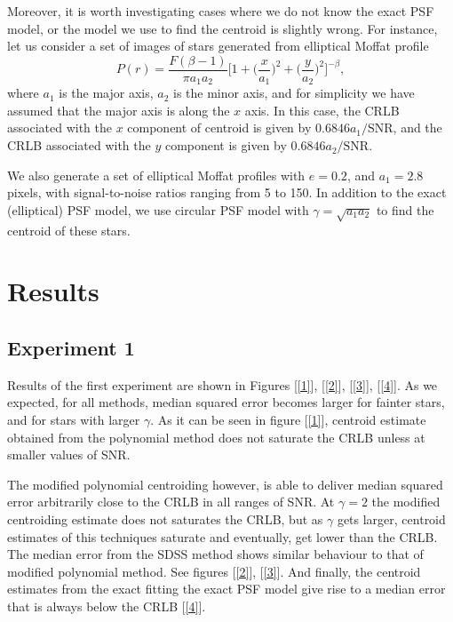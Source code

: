 \documentclass[12pt, preprint]{aastex}
\newcommand{\beq}{\begin{equation}}
\newcommand{\eeq}{\end{equation}}
\begin{document}
Moreover, it is worth investigating cases where we do not know the exact PSF model, or the model we use to find the centroid is slightly wrong. For instance, let us consider a set of images of stars generated from elliptical Moffat profile
\beq
P(r) = \frac{F(\beta - 1)}{\pi a_{1}a_{2}}\Big[1+\Big(\frac{x}{a_{1}}\Big)^{2}+\Big(\frac{y}{a_{2}}\Big)^{2}\Big]^{-\beta},
\eeq    
where $a_{1}$ is the major axis, $a_{2}$ is the minor axis, and for simplicity we have assumed that the major axis is along the $x$ axis. In this case, the CRLB associated with  the $x$ component of centroid is given by $0.6846 a_{1}/\text{SNR}$, and the CRLB associated with the $y$ component is given by $0.6846 a_{2}/\text{SNR}$. 

We also generate a set of elliptical Moffat profiles with $e=0.2$, and $a_{1} = 2.8$ pixels, with signal-to-noise ratios ranging from 5 to 150. In addition to the exact (elliptical) PSF model, we use circular PSF model with $\gamma = \sqrt{a_{1}a_{2}}$ to find the centroid of these stars.

 
 


\section{Results}\label{sec:results}

\subsection{Experiment 1}
   
Results of the first experiment are shown in Figures [\ref{1}], [\ref{2}], [\ref{3}], [\ref{4}]. As we expected, for all methods, median squared error becomes larger for fainter stars, and for stars with larger $\gamma$. As it can be seen in figure [\ref{1}], centroid estimate obtained from the polynomial method does not saturate the CRLB unless at smaller values of SNR. 

The modified polynomial centroiding however, is able to deliver median squared error arbitrarily close to the CRLB in all ranges of SNR. At $\gamma = 2$ the modified centroiding estimate does not saturates the CRLB, but as $\gamma$ gets larger, centroid estimates of this techniques saturate and eventually, get lower than the CRLB. The median error from the SDSS method shows similar behaviour to that of modified polynomial method. See figures [\ref{2}], [\ref{3}]. And finally, the centroid estimates from the exact fitting the exact PSF model give rise to a median error that is always below the CRLB [\ref{4}].
\end{document}
